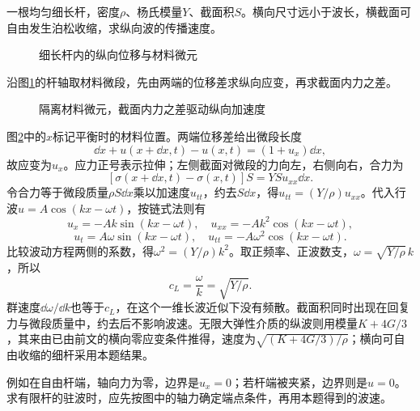 \begin{example}[细长弹性杆中的纵向声波]\label{ex:hw7-4}

一根均匀细长杆，密度$\rho$、杨氏模量$Y$、截面积$S$。横向尺寸远小于波长，横截面可自由发生泊松收缩，求纵向波的传播速度。

\end{example}


\begin{figure}[H]\centering
{}
\caption{细长杆内的纵向位移与材料微元}\label{fig:hw7-4-q}
\end{figure}

\begin{solution}
沿图\ref{fig:hw7-4-q}的杆轴取材料微段，先由两端的位移差求纵向应变，再求截面内力之差。

\begin{figure}[H]\centering
{}
\caption{隔离材料微元，截面内力之差驱动纵向加速度}\label{fig:hw7-4-s}
\end{figure}

图\ref{fig:hw7-4-s}中的$x$标记平衡时的材料位置。两端位移差给出微段长度
\[
 \dd x+u(x+\dd x,t)-u(x,t)=(1+u_x)\dd x,
\]
故应变为$u_x$。应力正号表示拉伸；左侧截面对微段的力向左，右侧向右，合力为
\[
 [\sigma(x+\dd x,t)-\sigma(x,t)]S
 =YSu_{xx}\dd x.
\]
令合力等于微段质量$\rho S\dd x$乘以加速度$u_{tt}$，约去$S\dd x$，得$u_{tt}=(Y/\rho)u_{xx}$。代入行波$u=A\cos(kx-\omega t)$，按链式法则有
\[
u_x=-Ak\sin(kx-\omega t),\quad u_{xx}=-Ak^2\cos(kx-\omega t),
\]
\[
u_t=A\omega\sin(kx-\omega t),\quad u_{tt}=-A\omega^2\cos(kx-\omega t).
\]
比较波动方程两侧的系数，得$\omega^2=(Y/\rho)k^2$。取正频率、正波数支，$\omega=\sqrt{Y/\rho}\,k$，所以
\[
 \boxed{c_L=\frac\omega k=\sqrt{Y/\rho}}.
\]
群速度$\dd\omega/\dd k$也等于$c_L$，在这个一维长波近似下没有频散。截面积同时出现在回复力与微段质量中，约去后不影响波速。无限大弹性介质的纵波则用模量$K+4G/3$，其来由已由前文的横向零应变条件推得，速度为$\sqrt{(K+4G/3)/\rho}$；横向可自由收缩的细杆采用本题结果。

例如在自由杆端，轴向力为零，边界是$u_x=0$；若杆端被夹紧，边界则是$u=0$。求有限杆的驻波时，应先按图中的轴力确定端点条件，再用本题得到的波速。

\end{solution}



